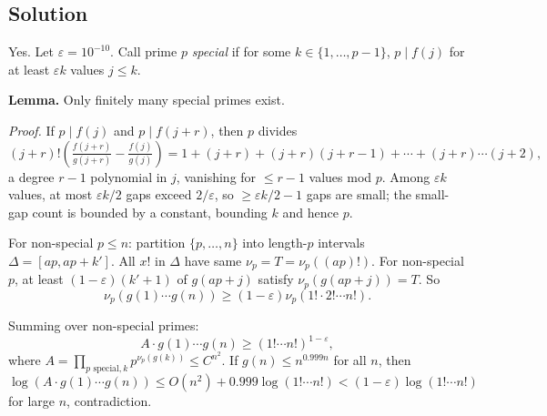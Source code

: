 \documentclass{article}
\begin{document}
\subsection*{Solution}
Yes. Let $\varepsilon = 10^{-10}$. Call prime $p$ \emph{special} if for some $k \in \{1,\ldots,p-1\}$, $p \mid f(j)$ for at least $\varepsilon k$ values $j \leq k$.

\textbf{Lemma.} Only finitely many special primes exist.

\emph{Proof.} If $p \mid f(j)$ and $p \mid f(j+r)$, then $p$ divides
\[ (j+r)! \left(\tfrac{f(j+r)}{g(j+r)} - \tfrac{f(j)}{g(j)}\right) = 1 + (j+r) + (j+r)(j+r-1) + \cdots + (j+r)\cdots(j+2), \]
a degree $r-1$ polynomial in $j$, vanishing for $\leq r-1$ values mod $p$. Among $\varepsilon k$ values, at most $\varepsilon k/2$ gaps exceed $2/\varepsilon$, so $\geq \varepsilon k/2 - 1$ gaps are small; the small-gap count is bounded by a constant, bounding $k$ and hence $p$.

For non-special $p \leq n$: partition $\{p, \ldots, n\}$ into length-$p$ intervals $\Delta = [ap, ap+k']$. All $x!$ in $\Delta$ have same $\nu_p = T = \nu_p((ap)!)$. For non-special $p$, at least $(1-\varepsilon)(k'+1)$ of $g(ap+j)$ satisfy $\nu_p(g(ap+j)) = T$. So
\[ \nu_p(g(1) \cdots g(n)) \geq (1-\varepsilon) \nu_p(1! \cdot 2! \cdots n!). \tag{1} \]

Summing over non-special primes:
\[ A \cdot g(1) \cdots g(n) \geq (1! \cdots n!)^{1-\varepsilon}, \]
where $A = \prod_{p \text{ special}, k} p^{\nu_p(g(k))} \leq C^{n^2}$. If $g(n) \leq n^{0.999 n}$ for all $n$, then
\[ \log(A \cdot g(1) \cdots g(n)) \leq O(n^2) + 0.999 \log(1!\cdots n!) < (1-\varepsilon) \log(1!\cdots n!) \]
for large $n$, contradiction.
\end{document}
